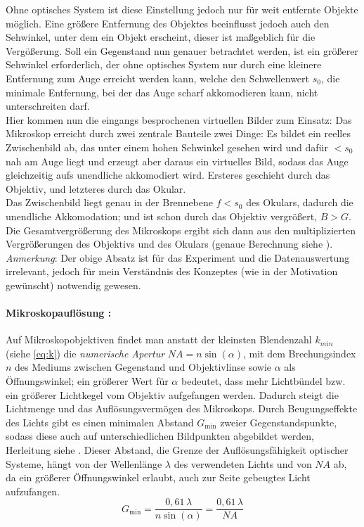 Ohne optisches System ist diese Einstellung jedoch nur für weit entfernte Objekte möglich. Eine größere Entfernung des Objektes beeinflusst jedoch auch den Sehwinkel, unter dem ein Objekt erscheint, dieser ist maßgeblich für die Vergößerung. Soll ein Gegenstand nun genauer betrachtet werden, ist ein größerer Sehwinkel erforderlich, der ohne optisches System nur durch eine kleinere Entfernung zum Auge erreicht werden kann, welche den Schwellenwert \(s_0\), die minimale Entfernung, bei der das Auge scharf akkomodieren kann, nicht unterschreiten darf.
\\Hier kommen nun die eingangs besprochenen virtuellen Bilder zum Einsatz: Das Mikroskop erreicht durch zwei zentrale Bauteile zwei Dinge: Es bildet ein reelles Zwischenbild ab, das unter einem hohen Sehwinkel gesehen wird und dafür \(<s_0\) nah am Auge liegt und erzeugt aber daraus ein virtuelles Bild, sodass das Auge gleichzeitig aufs unendliche akkomodiert wird. 
Ersteres geschieht durch das Objektiv, und letzteres durch das Okular.\\
Das Zwischenbild liegt genau in der Brennebene \(f<s_0\) des Okulars, dadurch die unendliche Akkomodation; und ist schon durch das Objektiv vergrößert, \(B>G\). Die Gesamtvergrößerung des Mikroskops ergibt sich dann aus den multiplizierten Vergrößerungen des Objektivs und des Okulars (genaue Berechnung siehe \autocite{Skript_1}).\\
\emph{Anmerkung}: Der obige Absatz ist für das Experiment und die Datenauswertung irrelevant, jedoch für mein Verständnis des Konzeptes (wie in der Motivation gewünscht) notwendig gewesen.  

\paragraph{Mikroskopauflösung \autocite{Numerische}:}
Auf Mikroskopobjektiven findet man anstatt der kleinsten Blendenzahl \(k_{min}\) (siehe \cref{eq:k}) die \emph{numerische Apertur} \(NA=n \sin(\alpha)\), mit dem Brechungsindex \(n\) des Mediums zwischen Gegenstand und Objektivlinse sowie \(\alpha\) als Öffnungswinkel; ein größerer Wert für \(\alpha\) bedeutet, dass mehr Lichtbündel bzw. ein größerer Lichtkegel vom Objektiv aufgefangen werden.
Dadurch steigt die Lichtmenge und das Auflösungsvermögen des Mikroskops. Durch Beugungseffekte des Lichts gibt es einen minimalen Abstand \(G_{\text{min}}\) zweier Gegenstandspunkte, sodass diese auch auf unterschiedlichen Bildpunkten abgebildet werden, Herleitung siehe \autocite{Skript_1}.
Dieser Abstand, die Grenze der Auflösungsfähigkeit optischer Systeme, hängt von der Wellenlänge \(\lambda\) des verwendeten Lichts und von \(NA\) ab, da ein größerer Öffnungswinkel erlaubt, auch zur Seite gebeugtes Licht aufzufangen.
\begin{equation}
    G_{\text{min}}=\frac{0,61\,\lambda}{n \sin(\alpha)}=\frac{0,61\,\lambda}{NA}
    \label{eq:NA}
\end{equation}